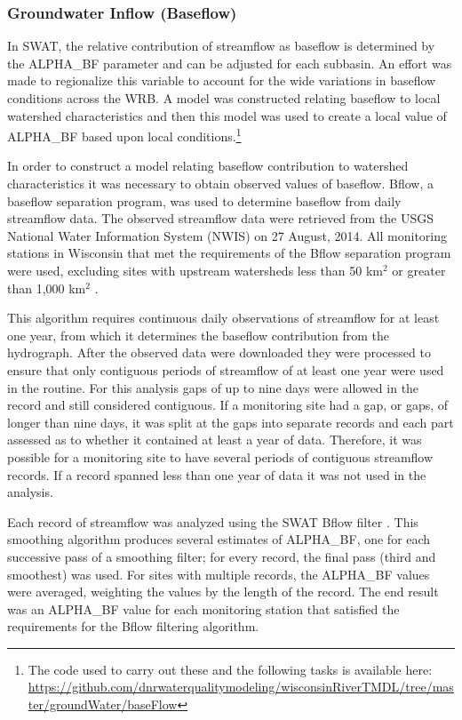 \subsubsection{Groundwater Inflow (Baseflow)}\label{sec:baseflow}
	In SWAT, the relative contribution of streamflow as baseflow is determined by the ALPHA\_BF parameter and can be adjusted for each subbasin. An effort was made to regionalize this variable to account for the wide variations in baseflow conditions across the WRB. A model was constructed relating baseflow to local watershed characteristics and then this model was used to create a local value of ALPHA\_BF based upon local conditions.\footnote{The code used to carry out these and the following tasks is available here: \url{https://github.com/dnrwaterqualitymodeling/wisconsinRiverTMDL/tree/master/groundWater/baseFlow}}
	
	In order to construct a model relating baseflow contribution to watershed characteristics it was necessary to obtain observed values of baseflow. Bflow, a baseflow separation program, \citep{arnold_automated_1995} was used to determine baseflow from daily streamflow data. The observed streamflow data were retrieved from the USGS National Water Information System (NWIS) \citep{usgs_nwis_2014} on 27 August, 2014. All monitoring stations in Wisconsin that met the requirements of the Bflow separation program were used, excluding sites with upstream watersheds less than 50 km$^2$ or greater than 1,000 km$^2$ \citep{arnold_regional_2000}.
	
	This algorithm requires continuous daily observations of streamflow for at least one year, from which it determines the baseflow contribution from the hydrograph.	After the observed data were downloaded they were processed to ensure that only contiguous periods of streamflow of at least one year were used in the routine. For this analysis gaps of up to nine days were allowed in the record and still considered contiguous. If a monitoring site had a gap, or gaps, of longer than nine days, it was split at the gaps into separate records and each part assessed as to whether it contained at least a year of data. Therefore, it was possible for a monitoring site to have several periods of contiguous streamflow records. If a record spanned less than one year of data it was not used in the analysis.
	
	Each record of streamflow was analyzed using the SWAT Bflow filter \citep{arnold_automated_1995}. This smoothing algorithm produces several estimates of ALPHA\_BF, one for each successive pass of a smoothing filter; for every record, the final pass (third and smoothest) was used. For sites with multiple records, the ALPHA\_BF values were averaged, weighting the values by the length of the record. The end result was an ALPHA\_BF value for each monitoring station that satisfied the requirements for the Bflow filtering algorithm.  

